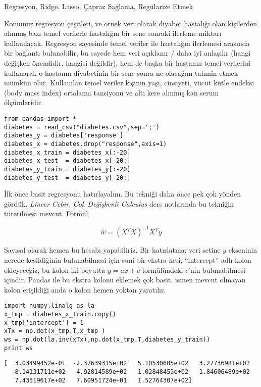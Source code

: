 \documentclass[12pt,fleqn]{article}\usepackage{../../common}
\begin{document}
Regresyon, Ridge, Lasso, Çapraz Sağlama, Regülarize Etmek

Konumuz regresyon çeşitleri, ve örnek veri olarak diyabet hastalığı
olan kişilerden alınmış bazı temel verilerle hastalığın bir sene
sonraki ilerleme miktarı kullanılacak. Regresyon sayesinde temel
veriler ile hastalığın ilerlemesi arasında bir bağlantı bulunabilir,
bu sayede hem veri açıklanır / daha iyi anlaşılır (hangi değişken
önemlidir, hangisi değildir), hem de başka bir hastanın temel
verilerini kullanarak o hastanın diyabetinin bir sene sonra ne
olacağını tahmin etmek mümkün olur. Kullanılan temel veriler kişinin
yaşı, cinsiyeti, vücut kütle endeksi (body mass index) ortalama
tansiyonu ve altı kere alınmış kan serum ölçümleridir.

\begin{verbatim}
from pandas import *
diabetes = read_csv("diabetes.csv",sep=';')
diabetes_y = diabetes['response']
diabetes_x = diabetes.drop("response",axis=1)
diabetes_x_train = diabetes_x[:-20]
diabetes_x_test  = diabetes_x[-20:]
diabetes_y_train = diabetes_y[:-20]
diabetes_y_test  = diabetes_y[-20:]
\end{verbatim}

İlk önce basit regresyonu hatırlayalım. Bu tekniği daha önce pek çok yönden
gördük. {\em Lineer Cebir}, {\em Çok Değişkenli Calculus} ders notlarında
bu tekniğin türetilmesi mevcut. Formül

$$ \hat{w} = (X^TX) ^{-1} X^{T}y $$

Sayısal olarak hemen bu hesabı yapabiliriz. Bir hatırlatma: veri setine $y$
ekseninin nerede kesildiğinin bulunabilmesi için suni bir ekstra kesi,
``intercept'' adlı kolon ekleyeceğiz, bu kolon iki boyutta $y=ax+c$
formülündeki $c$'nin bulunabilmesi içindir. Pandas ile bu ekstra kolonu
eklemek çok basit, ismen mevcut olmayan kolon erişildiği anda o kolon hemen
yoktan yaratılır.

\begin{verbatim}
import numpy.linalg as la
x_tmp = diabetes_x_train.copy()
x_tmp['intercept'] = 1
xTx = np.dot(x_tmp.T,x_tmp )
ws = np.dot(la.inv(xTx),np.dot(x_tmp.T,diabetes_y_train))
print ws
\end{verbatim}

\begin{verbatim}
[  3.03499452e-01  -2.37639315e+02   5.10530605e+02   3.27736981e+02
  -8.14131711e+02   4.92814589e+02   1.02848453e+02   1.84606489e+02
   7.43519617e+02   7.60951724e+01   1.52764307e+02]
\end{verbatim}
\end{document}
